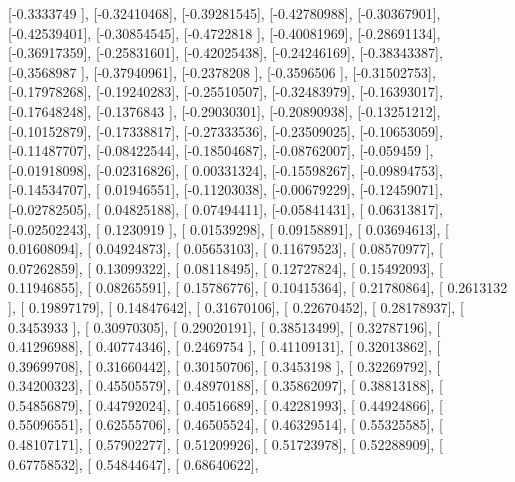 \documentclass{article}
\begin{document}
       [-0.3333749 ],
       [-0.32410468],
       [-0.39281545],
       [-0.42780988],
       [-0.30367901],
       [-0.42539401],
       [-0.30854545],
       [-0.4722818 ],
       [-0.40081969],
       [-0.28691134],
       [-0.36917359],
       [-0.25831601],
       [-0.42025438],
       [-0.24246169],
       [-0.38343387],
       [-0.3568987 ],
       [-0.37940961],
       [-0.2378208 ],
       [-0.3596506 ],
       [-0.31502753],
       [-0.17978268],
       [-0.19240283],
       [-0.25510507],
       [-0.32483979],
       [-0.16393017],
       [-0.17648248],
       [-0.1376843 ],
       [-0.29030301],
       [-0.20890938],
       [-0.13251212],
       [-0.10152879],
       [-0.17338817],
       [-0.27333536],
       [-0.23509025],
       [-0.10653059],
       [-0.11487707],
       [-0.08422544],
       [-0.18504687],
       [-0.08762007],
       [-0.059459  ],
       [-0.01918098],
       [-0.02316826],
       [ 0.00331324],
       [-0.15598267],
       [-0.09894753],
       [-0.14534707],
       [ 0.01946551],
       [-0.11203038],
       [-0.00679229],
       [-0.12459071],
       [-0.02782505],
       [ 0.04825188],
       [ 0.07494411],
       [-0.05841431],
       [ 0.06313817],
       [-0.02502243],
       [ 0.1230919 ],
       [ 0.01539298],
       [ 0.09158891],
       [ 0.03694613],
       [ 0.01608094],
       [ 0.04924873],
       [ 0.05653103],
       [ 0.11679523],
       [ 0.08570977],
       [ 0.07262859],
       [ 0.13099322],
       [ 0.08118495],
       [ 0.12727824],
       [ 0.15492093],
       [ 0.11946855],
       [ 0.08265591],
       [ 0.15786776],
       [ 0.10415364],
       [ 0.21780864],
       [ 0.2613132 ],
       [ 0.19897179],
       [ 0.14847642],
       [ 0.31670106],
       [ 0.22670452],
       [ 0.28178937],
       [ 0.3453933 ],
       [ 0.30970305],
       [ 0.29020191],
       [ 0.38513499],
       [ 0.32787196],
       [ 0.41296988],
       [ 0.40774346],
       [ 0.2469754 ],
       [ 0.41109131],
       [ 0.32013862],
       [ 0.39699708],
       [ 0.31660442],
       [ 0.30150706],
       [ 0.3453198 ],
       [ 0.32269792],
       [ 0.34200323],
       [ 0.45505579],
       [ 0.48970188],
       [ 0.35862097],
       [ 0.38813188],
       [ 0.54856879],
       [ 0.44792024],
       [ 0.40516689],
       [ 0.42281993],
       [ 0.44924866],
       [ 0.55096551],
       [ 0.62555706],
       [ 0.46505524],
       [ 0.46329514],
       [ 0.55325585],
       [ 0.48107171],
       [ 0.57902277],
       [ 0.51209926],
       [ 0.51723978],
       [ 0.52288909],
       [ 0.67758532],
       [ 0.54844647],
       [ 0.68640622],
\end{document}
